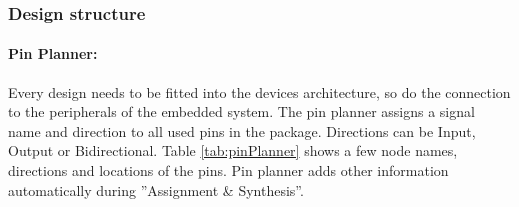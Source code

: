 \documentclass[12pt,a4paper,english,twoside,openright]{tutthesis}
\begin{document}
			\subsubsection{Design structure}\label{subsubsec:designStructure}
				\paragraph{Pin Planner:	}
Every design needs to be fitted into the devices architecture, so do the connection to the peripherals of the embedded system. The pin planner assigns a signal name and direction to all used pins in the package. Directions can be Input, Output or Bidirectional. Table \ref{tab:pinPlanner} shows a few node names, directions and locations of the pins. Pin planner adds other information automatically during ''Assignment \& Synthesis''.
\end{document}
